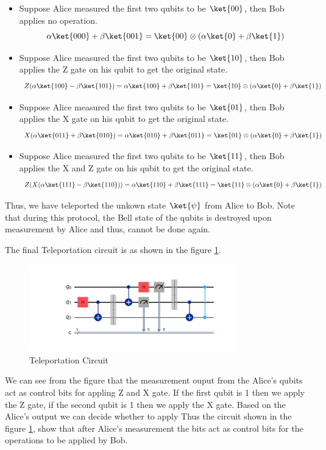\documentclass[12pt, oneside]{book}
\theoremstyle{definition}
\theoremstyle{definition}
\theoremstyle{remark}
\begin{document}
\begin{enumerate}
    \begin{itemize}
        \item Suppose Alice measured the first two qubits to be $\ket{00}$, then Bob applies no operation.
        \[
            \alpha\ket{000}+\beta\ket{001}=\ket{00}\otimes (\alpha\ket{0}+\beta\ket{1})
        \]
        \item Suppose Alice measured the first two qubits to be $\ket{10}$, then Bob applies the Z gate on his qubit to get the original state.
        \[ 
            Z(\alpha\ket{100}-\beta\ket{101})=\alpha\ket{100}+\beta\ket{101}=\ket{10}\otimes (\alpha\ket{0}+\beta\ket{1})
        \]
        \item Suppose Alice measured the first two qubits to be $\ket{01}$, then Bob applies the X gate on his qubit to get the original state.
        \[ 
            X(\alpha\ket{011}+\beta\ket{010})=\alpha\ket{010}+\beta\ket{011}=\ket{01}\otimes (\alpha\ket{0}+\beta\ket{1})
        \]
        \item Suppose Alice measured the first two qubits to be $\ket{11}$, then Bob applies the X and Z gate on his qubit to get the original state.
        \[ 
            Z(X(\alpha\ket{111}-\beta\ket{110}))=\alpha\ket{110}+\beta\ket{111}=\ket{11}\otimes (\alpha\ket{0}+\beta\ket{1})
        \]
    \end{itemize}
    Thus, we have teleported the unkown state $\ket{\psi}$ from Alice to Bob. Note that during this protocol, the Bell state of the qubits is destroyed upon measurement by Alice and thus, cannot be done again.
\end{enumerate}
The final Teleportation circuit is as shown in the figure \ref{fig:teleportation}.
\begin{figure}[H]
    \centering
    \includegraphics[width=0.8\textwidth]{../images/teleportation.png}
    \caption{Teleportation Circuit}
    \label{fig:teleportation}
\end{figure}
We can see from the figure that the measurement ouput from the Alice's qubits act as control bits for appling Z and X gate.
If the first qubit is 1 then we apply the Z gate, if the second qubit is 1 then we apply the X gate. Based on the Alice's output we can decide whether to apply  Thus the circuit shown in the figure \ref{fig:teleportation}, show that
after Alice's measurement the bits act as control bits for the operations to be applied by Bob.
\end{document}
